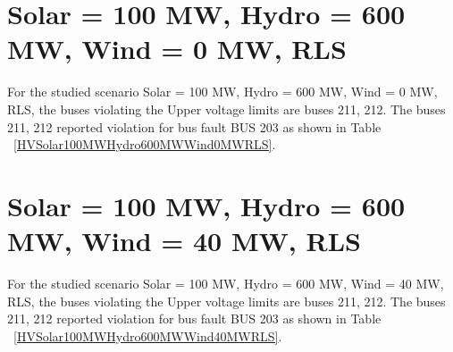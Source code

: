 \documentclass[10pt]{report}
\begin{document}
\section{Solar = 100 MW, Hydro = 600 MW, Wind = 0 MW, RLS}
For the studied scenario Solar = 100 MW, Hydro = 600 MW, Wind = 0 MW, RLS, the buses violating the Upper voltage limits are buses 211, 212.
The buses 211, 212 reported violation for bus fault BUS 203 as shown in Table ~\ref{HVSolar100MWHydro600MWWind0MWRLS}.
\begin{table}[H]
\caption{Contingencies reporting bus voltages greater than emergency voltage of 1.1 PU for scenario Solar = 100 MW, Hydro = 600 MW, Wind = 0 MW, RLS}
\label{HVSolar100MWHydro600MWWind0MWRLS}
\centering
{}
\end{table}


\section{Solar = 100 MW, Hydro = 600 MW, Wind = 40 MW, RLS}
For the studied scenario Solar = 100 MW, Hydro = 600 MW, Wind = 40 MW, RLS, the buses violating the Upper voltage limits are buses 211, 212.
The buses 211, 212 reported violation for bus fault BUS 203 as shown in Table ~\ref{HVSolar100MWHydro600MWWind40MWRLS}.
\begin{table}[H]
\caption{Contingencies reporting bus voltages greater than emergency voltage of 1.1 PU for scenario Solar = 100 MW, Hydro = 600 MW, Wind = 40 MW, RLS}
\label{HVSolar100MWHydro600MWWind40MWRLS}
\centering
{}
\end{table}
\end{document}
